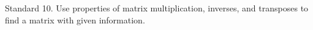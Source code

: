 Standard 10.	Use properties of matrix multiplication, inverses, and transposes to find a matrix with given information. 

\ifprintanswers
\else %
 \newpage
\fi

\begin{solution}
   
\end{solution}